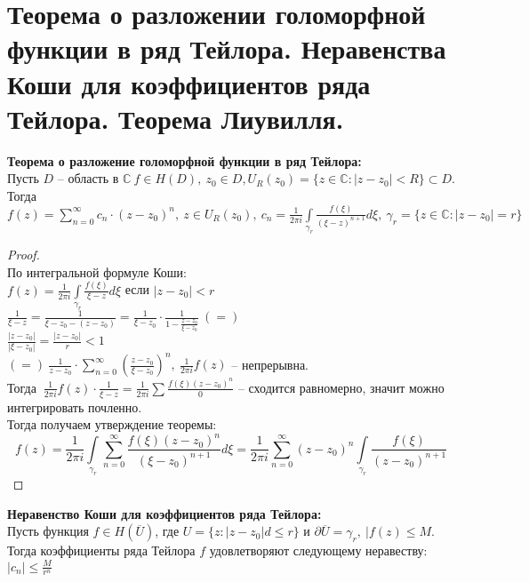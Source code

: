 \section{Теорема о разложении голоморфной функции в ряд Тейлора. Неравенства Коши для коэффициентов ряда Тейлора. Теорема Лиувилля.}

\textbf{Теорема о разложение голоморфной функции в ряд Тейлора:}\\[2mm]
Пусть $D$ -- область в $\mathbb{C} \ f \in H(D), \ z_0 \in D, U_R(z_0) = \{z \in \mathbb{C}: |z-z_0| < R\} \subset D$. \\[2mm]
Тогда $f(z) = \sum_{n=0}^{\infty}c_n \cdot (z-z_0)^n, \ z \in U_R(z_0), \ c_n = \frac{1}{2\pi i} \int \limits_{{\gamma}_r} \frac{f(\xi)}{(\xi-z)^{n+1}} d\xi, \ \gamma_r = \{z \in \mathbb{C}: |z-z_0| = r\}$


\begin{proof}
	\ \\
	По интегральной формуле Коши: \\[2mm]
	$f(z) = \frac{1}{2 \pi i} \int \limits_{{\gamma}_r} \frac{f(\xi)}{\xi - z} d\xi$ если $|z-z_0| < r$\\[2mm]
	$\frac{1}{\xi - z} = \frac{1}{\xi - z_0 - (z - z_0)} = \frac{1}{\xi - z_0} \cdot \frac{1}{1 - \frac{z-z_0}{\xi - z_0}} \ (=)$\\[2mm]
	$\frac{|z-z_0|}{|\xi - z_0|} = \frac{|z - z_0|}{r} < 1$\\[2mm]
	$(=) \ \frac{1}{z-z_0} \cdot \sum_{n=0}^{\infty} \left( \frac {z-z_0}{\xi - z_0}\right)^n, \ \frac{1}{2 \pi i}f(z)$ -- непрерывна. \\[2mm]
	Тогда $ \ \frac{1}{2 \pi i}f(z) \cdot \frac{1}{\xi - z} = \frac{1}{2 \pi i} \sum \frac{f(\xi)(z-z_0)^n}{0}$ -- сходится равномерно, значит можно интегрировать почленно. \\[2mm]
	Тогда получаем утверждение теоремы:
	$$
	f(z) = \frac{1}{2 \pi i} \int \limits_{{\gamma}_r} \sum_{n=0}^{\infty}\frac{f(\xi) (z - z_0)^n}{(\xi - z_0)^{n+1}}d\xi = \frac{1}{2 \pi i}\sum_{n=0}^{\infty}(z-z_0)^n \int \limits_{{\gamma}_r} \frac{f(\xi)}{(z-z_0)^{n+1}}
	$$
\end{proof}


\textbf{Неравенство Коши для коэффициентов ряда Тейлора:}\\[2mm]
Пусть функция $f \in H(\overline{U})$, где $U = \{ z: |z-z_0|d \leq r\}$ и $\partial\overline{U} = {\gamma}_r, \ |f(z) \leq M$. \\[2mm]
Тогда коэффициенты ряда Тейлора $f$ удовлетворяют следующему неравеству: $|c_n| \leq \frac{M}{r^n}$ 


